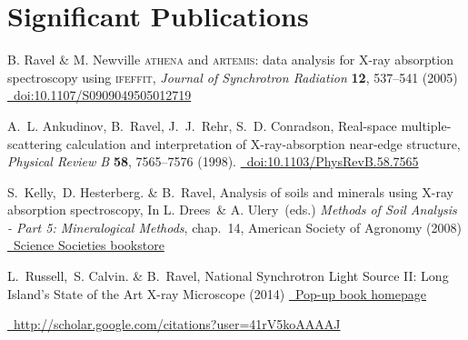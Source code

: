 \documentclass[11pt]{moderncv}
\begin{document}
\section{Significant Publications}
\label{sec:highlights}

%
{\small B. Ravel \& M. Newville \textsc{athena} and
  \textsc{artemis}: data analysis for X-ray absorption spectroscopy
  using \textsc{ifeffit}, \emph{Journal of Synchrotron Radiation}
  \textbf{12}, 537--541 (2005)
  \href{http://dx.doi.org/10.1107/S0909049505012719}
  {\color{color2}\homepagesymbol~doi:10.1107/S0909049505012719}}

%
{\small A.~L. Ankudinov,  B.~Ravel,  J.~J.~Rehr,  S.~D. Conradson,
  Real-space multiple-scattering calculation and interpretation of
  X-ray-absorption near-edge structure, \emph{Physical Review B}
  \textbf{58}, 7565--7576 (1998).
  \href{http://dx.doi.org/10.1103/PhysRevB.58.7565}
  {\color{color2}\homepagesymbol~doi:10.1103/PhysRevB.58.7565}}

%
{\small S.\ Kelly,\ D. Hesterberg. \& B.\ Ravel, Analysis of soils and
  minerals using X-ray absorption spectroscopy, In L. Drees\ \&
  A. Ulery\ (eds.)  \emph{Methods of Soil Analysis - Part 5:
    Mineralogical Methods}, chap.~14, American Society of Agronomy
  (2008)
  \href{https://portal.sciencesocieties.org/Purchase/ProductDetail.aspx?Product_code=802f0511-76f0-dc11-b6b8-0013210e308c}
  {\color{color2}\homepagesymbol~Science Societies bookstore}}

%
{\small L.\ Russell,\ S. Calvin. \& B.\ Ravel, National Synchrotron
  Light Source II: Long Island's State of the Art X-ray Microscope
  (2014)
  \href{http://bruceravel.github.io/synchrotron_pop_up_book/}
  {\color{color2}\homepagesymbol~Pop-up book homepage}}

%
{\small \href{http://scholar.google.com/citations?user=41rV5koAAAAJ}
{\color{color2}\homepagesymbol~http://scholar.google.com/citations?user=41rV5koAAAAJ}}

\nocite{*}


\end{document}
